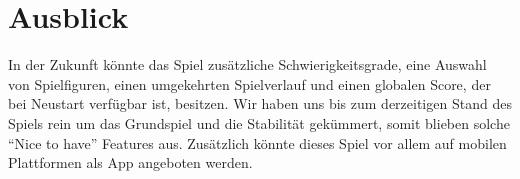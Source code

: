\chapter{Ausblick}
In der Zukunft könnte das Spiel zusätzliche Schwierigkeitsgrade, eine Auswahl von Spielfiguren, einen umgekehrten Spielverlauf und einen globalen Score, der bei Neustart verfügbar ist, besitzen. Wir haben uns bis zum derzeitigen Stand des Spiels rein um das Grundspiel und die Stabilität gekümmert, somit blieben solche ``Nice to have'' Features aus. Zusätzlich könnte dieses Spiel vor allem auf mobilen Plattformen als App angeboten werden.